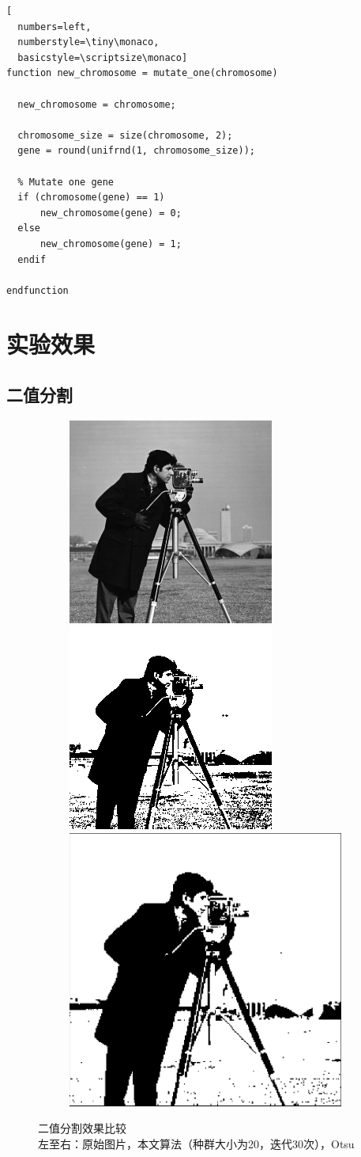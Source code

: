\documentclass[11pt,a4paper,titlepage]{article}
\begin{document}
\begin{lstlisting}[
  numbers=left,
  numberstyle=\tiny\monaco,
  basicstyle=\scriptsize\monaco]
function new_chromosome = mutate_one(chromosome)

  new_chromosome = chromosome;

  chromosome_size = size(chromosome, 2);
  gene = round(unifrnd(1, chromosome_size));

  % Mutate one gene
  if (chromosome(gene) == 1)
      new_chromosome(gene) = 0;
  else
      new_chromosome(gene) = 1;
  endif

endfunction
\end{lstlisting}

\section{实验效果}

\subsection{二值分割}

\begin{figure}[!htb]
  \begin{subfigure}{\linewidth}
  \includegraphics[width=.3\linewidth]{cameraman.png}\hfill
  \includegraphics[width=.3\linewidth]{ga-cameraman.png}\hfill
  \includegraphics[width=.3\linewidth]{otsu-cameraman.png}
  \end{subfigure}\par\medskip
  \caption{二值分割效果比较\\
  左至右：原始图片，本文算法（种群大小为20，迭代30次），Otsu}
\end{figure}
\end{document}
